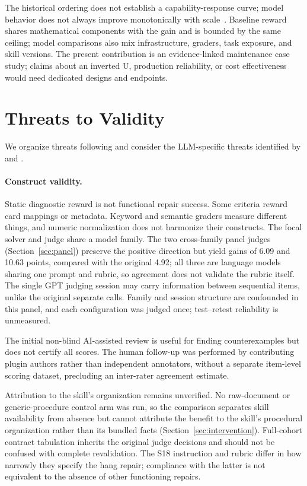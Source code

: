 \documentclass[11pt]{article}
\begin{document}
The historical ordering does not establish a capability-response curve; model behavior does not always improve monotonically with scale~\citep{inverse-scaling}. Baseline reward shares mathematical components with the gain and is bounded by the same ceiling; model comparisons also mix infrastructure, graders, task exposure, and skill versions. The present contribution is an evidence-linked maintenance case study; claims about an inverted U, production reliability, or cost effectiveness would need dedicated designs and endpoints.

\section{Threats to Validity}\label{sec:threats}
We organize threats following \citet{wohlin2012experimentation} and consider the LLM-specific threats identified by \citet{sallou2024breaking} and \citet{wagner2025towards}.
\paragraph{Construct validity.}
Static diagnostic reward is not functional repair success. Some criteria reward card mappings or metadata. Keyword and semantic graders measure different things, and numeric normalization does not harmonize their constructs. The focal solver and judge share a model family. The two cross-family panel judges (Section~\ref{sec:panel}) preserve the positive direction but yield gains of 6.09 and 10.63 points, compared with the original 4.92; all three are language models sharing one prompt and rubric, so agreement does not validate the rubric itself. The single GPT judging session may carry information between sequential items, unlike the original separate calls. Family and session structure are confounded in this panel, and each configuration was judged once; test--retest reliability is unmeasured.

The initial non-blind AI-assisted review is useful for finding counterexamples but does not certify all scores. The human follow-up was performed by contributing plugin authors rather than independent annotators, without a separate item-level scoring dataset, precluding an inter-rater agreement estimate.

Attribution to the skill's organization remains unverified. No raw-document or generic-procedure control arm was run, so the comparison separates skill availability from absence but cannot attribute the benefit to the skill's procedural organization rather than its bundled facts (Section~\ref{sec:intervention}). Full-cohort contract tabulation inherits the original judge decisions and should not be confused with complete revalidation. The S18 instruction and rubric differ in how narrowly they specify the hang repair; compliance with the latter is not equivalent to the absence of other functioning repairs.
\end{document}
